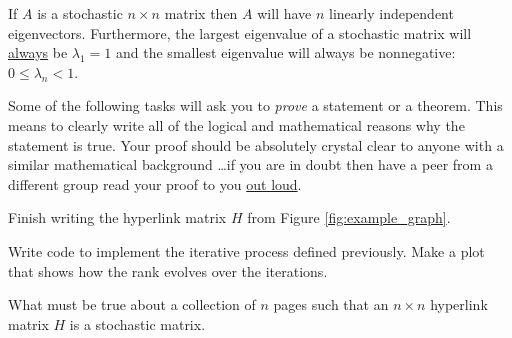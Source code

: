 \begin{thm} \label{thm:largest_ev_stochastic}
    If $A$ is a stochastic $n \times n$ matrix then $A$ will have $n$ linearly independent
    eigenvectors.  Furthermore, the largest eigenvalue of a stochastic matrix will
    \underline{always} be $\lambda_1 = 1$ and the smallest eigenvalue  will always be
    nonnegative: $0 \le \lambda_n < 1$.
\end{thm}

Some of the following tasks will ask you to {\it prove} a statement or a theorem.  This
means to clearly write all of the logical and mathematical reasons why the statement is
true. Your proof should be absolutely crystal clear to anyone with a similar mathematical
background \dots if you are in doubt then have a peer from a different group read your
proof to you \underline{out loud}.

\begin{problem}
    Finish writing the hyperlink matrix $H$ from Figure \ref{fig:example_graph}.
\end{problem}

\begin{problem}
    Write \ProgLang code to implement the iterative process defined previously. Make a plot
    that shows how the rank evolves over the iterations.
\end{problem}


\begin{problem}
    What must be true about a collection of $n$ pages such that an $n\times n$
        hyperlink matrix $H$ is a stochastic matrix.
\end{problem}

